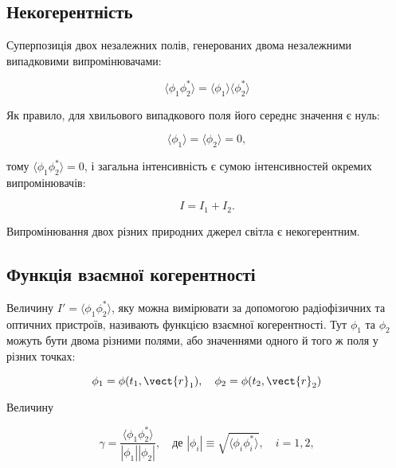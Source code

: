 \subsection*{Некогерентність}

Суперпозиція двох незалежних полів, генерованих двома незалежними випадковими випромінювачами:

\begin{equation*}
\langle \phi_1 \phi_2^{*} \rangle = \langle \phi_1 \rangle \langle \phi_2^{*} \rangle
\end{equation*}

Як правило, для хвильового випадкового поля його середнє значення є нуль:

\begin{equation*}
\langle \phi_1 \rangle = \langle \phi_2 \rangle = 0,
\end{equation*}

тому \(\langle \phi_1 \phi_2^{*} \rangle = 0\), і загальна інтенсивність є сумою інтенсивностей окремих випромінювачів:

\begin{equation*}
I = I_1 + I_2.
\end{equation*}

Випромінювання двох різних природних джерел світла є некогерентним.

\subsection*{Функція взаємної когерентності}

Величину \(I' = \langle \phi_1 \phi_2^{*} \rangle\), яку можна вимірювати за допомогою радіофізичних та оптичних пристроїв, називають функцією взаємної
когерентності. Тут \(\phi_1\) та \(\phi_2\) можуть бути двома різними полями, або значеннями одного й того ж поля у різних точках:

\begin{equation*}
\phi_1 = \phi(t_1, \vect{r}_1), \quad \phi_2 = \phi(t_2, \vect{r}_2)
\end{equation*}

Величину

\begin{equation*}
\gamma = \frac{\langle \phi_1 \phi_2^{*} \rangle}{|\phi_1||\phi_2|}, \quad \text{де } |\phi_i| \equiv \sqrt{\langle \phi_i \phi_i^{*} \rangle}, \quad i
= 1, 2,
\end{equation*}

